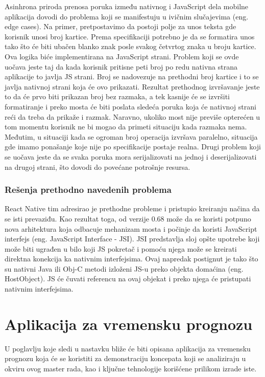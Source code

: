 \documentclass[12pt,oneside]{memoir}
\begin{document}
Asinhrona priroda prenosa poruka između nativnog i JavaScript dela mobilne aplikacija dovodi do problema koji se manifestuju u ivičnim slučajevima (eng. edge cases). Na primer, pretpostavimo da postoji polje za unos teksta gde korisnik unosi broj kartice. Prema specifikaciji potrebno je da se formatira unos tako što će biti ubačen blanko znak posle svakog četvrtog znaka u broju kartice. Ova logika biće implementirana na JavaScript strani. Problem koji se ovde uočava jeste taj da kada korisnik pritisne peti broj po redu nativna strana aplikacije to javlja JS strani. Broj se nadovezuje na prethodni broj kartice i to se javlja nativnoj strani koja će ovo prikazati. Rezultat prethodnog izvršavanje jeste to da će prvo biti prikazan broj bez razmaka, a tek kasnije će se izvršiti formatiranje i preko mosta će biti poslata sledeća poruka koja će nativnoj strani reći da treba da prikaže i razmak. Naravno, ukoliko most nije previše opterećen u tom momentu korisnik ne bi mogao da primeti situaciju kada razmaka nema. Međutim, u situaciji kada se ogroman broj operacija izvršava paralelno, situacija gde imamo ponašanje koje nije po specifikacije postaje realna. Drugi problem koji se uočava jeste da se svaka poruka mora serijalizovati na jednoj i deserijalizovati na drugoj strani, što dovodi do povećane potrošnje resursa.

\subsection{Rešenja prethodno navedenih problema}

React Native tim adresirao je prethodne probleme i pristupio kreiranju načina da se isti prevaziđu. Kao rezultat toga, od verzije 0.68 može da se koristi potpuno nova arhitektura koja odbacuje mehanizam mosta i počinje da koristi JavaScript interfejs (eng. JavaScript Interface - JSI). JSI predstavlja sloj opšte upotrebe koji može biti ugrađen u bilo koji JS pokretač i pomoću njega može se kreirati direktna konekcija ka nativnim interfejsima. Ovaj napredak postignut je tako što su nativni Java ili Obj-C metodi izloženi JS-u preko objekta domaćina (eng. HostObject). JS će čuvati referencu na ovaj objekat i preko njega će pristupati nativnim interfejsima.

\chapter{Aplikacija za vremensku prognozu}

U poglavlju koje sledi u nastavku bliže će biti opisana aplikacija za vremensku prognozu koja će se koristiti za demonstraciju koncepata koji se analiziraju u okviru ovog master rada, kao i ključne tehnologije korišćene prilikom izrade iste.
\end{document}
